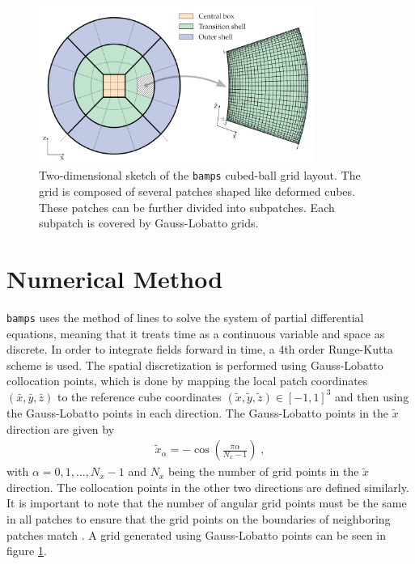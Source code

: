 \begin{figure}[t!]
    \centering
    \includegraphics[width=0.8\textwidth]{Figures/Cubed_Ball.png}
    \caption{Two-dimensional sketch of the \texttt{bamps} cubed-ball grid layout. The grid is composed of several patches shaped like deformed cubes. These patches can be further divided into subpatches. Each subpatch is covered by Gauss-Lobatto grids. \cite{Pseudospectral_method_for_gravitational_wave_collapse}}
    \label{fig:cubed_ball_grid}
\end{figure}

\section{Numerical Method}
\label{section:Numerical_Method}

\texttt{bamps} uses the method of lines to solve the system of partial differential equations, meaning that it treats time as a continuous variable and space as discrete. In order to integrate fields forward in time, a 4th order Runge-Kutta scheme is used. The spatial discretization is performed using Gauss-Lobatto collocation points, which is done by mapping the local patch coordinates $(\bar{x},\bar{y},\bar{z})$ to the reference cube coordinates $(\tilde{x},\tilde{y},\tilde{z}) \in [-1,1]^3$ and then using the Gauss-Lobatto points in each direction. The Gauss-Lobatto points in the $\tilde{x}$ direction are given by
%
\begin{align}
    \tilde{x}_\alpha = - \cos\left(\frac{\pi \alpha}{N_x -1}\right) \; ,
\end{align}
%
with $\alpha = 0,1,\ldots,N_x -1$ and $N_x$ being the number of grid points in the $\tilde{x}$ direction. The collocation points in the other two directions are defined similarly. It is important to note that the number of angular grid points must be the same in all patches to ensure that the grid points on the boundaries of neighboring patches match \cite{Pseudospectral_method_for_gravitational_wave_collapse}. A grid generated using Gauss-Lobatto points can be seen in figure \ref{fig:cubed_ball_grid}.

